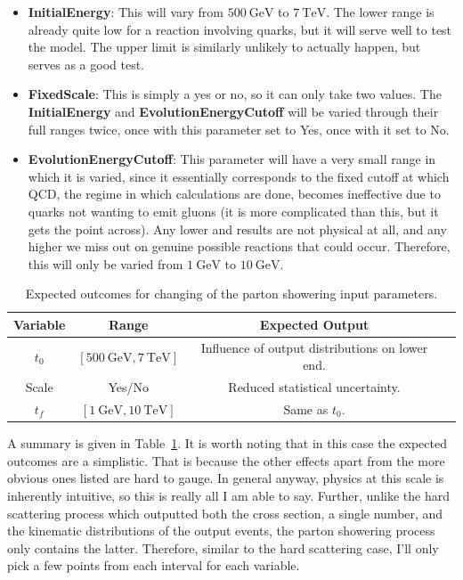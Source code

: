 \begin{itemize}
\item \textbf{InitialEnergy}: This will vary from $\qty{500}{\giga\electronvolt}$ to $\qty{7}{\tera\electronvolt}$. The lower range is already quite low for a reaction involving quarks, but it will serve well to test the model. The upper limit is similarly unlikely to actually happen, but serves as a good test.
\item \textbf{FixedScale}: This is simply a yes or no, so it can only take two values. The \textbf{InitialEnergy} and \textbf{EvolutionEnergyCutoff} will be varied through their full ranges twice, once with this parameter set to Yes, once with it set to No.
\item \textbf{EvolutionEnergyCutoff}: This parameter will have a very small range in which it is varied, since it essentially corresponds to the fixed cutoff at which QCD, the regime in which calculations are done, becomes ineffective due to quarks not wanting to emit gluons (it is more complicated than this, but it gets the point across). Any lower and results are not physical at all, and any higher we miss out on genuine possible reactions that could occur. Therefore, this will only be varied from $\qty{1}{\giga\electronvolt}$ to $\qty{10}{\giga\electronvolt}$.
\end{itemize}


\begin{center}
  \begin{table}[ht]
    \centering
    \begin{tabular}{|c||c|c|c}
      \hline
      Variable & Range & Expected Output \\ \hline
      $t_0$ & $[\qty{500}{\giga\electronvolt},\qty{7}{\tera\electronvolt}]$ & Influence of output distributions on lower end. \\ \hline
      Scale & Yes/No & Reduced statistical uncertainty. \\ \hline
      $t_f$ & $[\qty{1}{\giga\electronvolt},\qty{10}{\tera\electronvolt}]$ & Same as $t_0$. \\ \hline
    \end{tabular}
    \caption{Expected outcomes for changing of the parton showering input parameters.}
    \label{tbl:parton-showering-vars}
  \end{table}
\end{center}

A summary is given in Table~\ref{tbl:parton-showering-vars}. It is worth noting that in this case the expected outcomes are a simplistic. That is because the other effects apart from the more obvious ones listed are hard to gauge. In general anyway, physics at this scale is inherently intuitive, so this is really all I am able to say. Further, unlike the hard scattering process which outputted both the cross section, a single number, and the kinematic distributions of the output events, the parton showering process only contains the latter. Therefore, similar to the hard scattering case, I'll only pick a few points from each interval for each variable.


